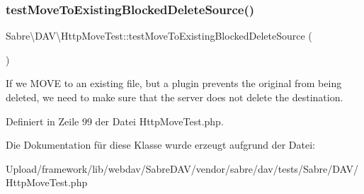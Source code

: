 \mbox{\label{class_sabre_1_1_d_a_v_1_1_http_move_test_afa9b76412c488808286670197c7e2e22}} 
\subsubsection{\texorpdfstring{test\+Move\+To\+Existing\+Blocked\+Delete\+Source()}{testMoveToExistingBlockedDeleteSource()}}
{\footnotesize\ttfamily Sabre\textbackslash{}\+D\+A\+V\textbackslash{}\+Http\+Move\+Test\+::test\+Move\+To\+Existing\+Blocked\+Delete\+Source (\begin{DoxyParamCaption}{ }\end{DoxyParamCaption})}

If we M\+O\+VE to an existing file, but a plugin prevents the original from being deleted, we need to make sure that the server does not delete the destination. 

Definiert in Zeile 99 der Datei Http\+Move\+Test.\+php.



Die Dokumentation für diese Klasse wurde erzeugt aufgrund der Datei\+:\begin{DoxyCompactItemize}
\item 
Upload/framework/lib/webdav/\+Sabre\+D\+A\+V/vendor/sabre/dav/tests/\+Sabre/\+D\+A\+V/Http\+Move\+Test.\+php\end{DoxyCompactItemize}
